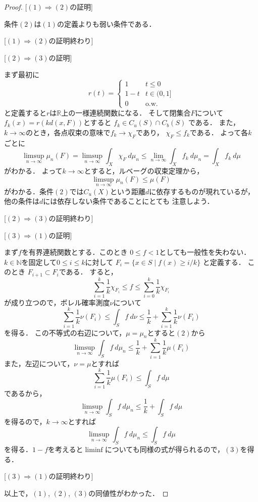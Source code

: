 \documentclass[leqno, a4paper, 12pt]{jsarticle}
\newcommand{\To}{\Longrightarrow}
\newcommand{\nn}{\mathbb{N}}
\newcommand{\rr}{\mathbb{R}}
\begin{document}
\begin{proof}

[$(1)\To (2)$の証明]

条件$(2)$は$(1)$の定義よりも弱い条件である．

[$(1)\To (2)$の証明終わり]

[$(2)\To (3)$の証明]

まず最初に
\[
r(t)=\begin{cases}
1 & \text{$t\le 0$}\\
1-t & \text{$t\in (0, 1]$}\\
0 & \text{o.w.}
\end{cases}
\]
と定義すると$r$は$\rr$上の一様連続関数になる．
そして閉集合$F$について
$f_k(x)=r(kd(x, F))$とすると
$f_k\in C_u(S)\cap C_b(S)$
である．
また，$k\to \infty$のとき，各点収束の意味で$f_k\to \chi_{F}$であり，
$\chi_F\le f_k$である．
よって各$k$ごとに
\[
\limsup_{n\to \infty}\mu_n(F)=
\limsup_{n\to \infty}\int_X \chi_F\ d\mu_n\le \lim_{n\to \infty}\int_X f_k\ d\mu_n=\int_X f_k\ d\mu
\]
がわかる．
よって$k\to \infty$とすると，ルベーグの収束定理から，
\[
\limsup_{n\to \infty}\mu_n(F)\le \mu(F)
\]
がわかる．条件$(2)$では$C_{u}(X)$という距離$d$に依存するものが現れているが，他の条件は$d$には依存しない条件であることにとても
注意しよう．

[$(2)\To (3)$の証明終わり]


[$(3)\To (1)$の証明]


まず$f$を有界連続関数とする．このとき
$0\le f<1$としても一般性を失わない．
$k\in \nn$を固定して$0\le i\le k$に対して
$F_i=\{x\in S\mid f(x)\ge i/k\}$
と定義する．
このとき
$ F_{i+1}\subset F_i$である．
すると，
\[
	\sum_{i=1}^{k}\frac{1}{k}\chi_{F_i}
	\le 
	f
	\le
	\sum_{i=0}^k\frac{1}{k}\chi_{F_{i}} 
\]
が成り立つので，ボレル確率測度$\nu$について
\[
	\sum_{i=1}^k\frac{1}{k}\nu(F_i)
	\le
	 \int_S f\ d\nu 
	 \le 
	\frac{1}{k}+ \sum_{i=1}^k\frac{1}{k}\nu(F_i)
\]
を得る．
この不等式の右辺について，$\mu=\mu_n$とすると$(2)$から
\[
	\limsup_{n\to \infty}\int_S f\ d\mu_n
	\le 
	\frac{1}{k}+\sum_{i=1}^k\frac{1}{k}\mu(F_i)
\]
また，左辺について，$\nu=\mu$とすれば
\[
	\sum_{i=1}^k\frac{1}{k}\mu(F_i)
	\le
	 \int_S f\ d\mu 
\]
であるから，
\[
\limsup_{n\to \infty}\int_Sf \ d\mu_n\le \frac{1}{k}+\int_Sf\ d\mu
\]
を得るので，$k\to \infty$とすれば
\[
\limsup_{n\to \infty}\int_Sf \ d\mu_n\le \int_Sf\ d\mu
\]
を得る．$1-f$を考えると$\liminf$についても同様の式が得られるので，$(3)$を得る．

[$(3)\To (1)$の証明終わり]

以上で，$(1)$, $(2)$, $(3)$の同値性がわかった．


\end{proof}
\end{document}

